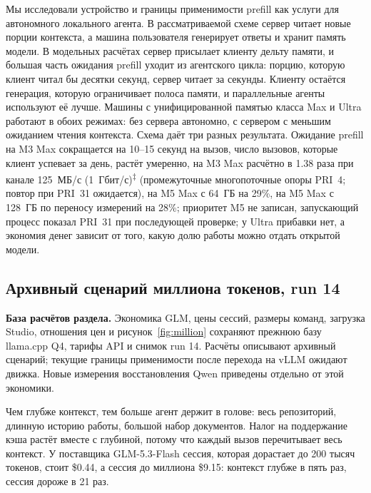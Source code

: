 Мы исследовали устройство и границы применимости prefill как услуги для автономного локального агента.
В рассматриваемой схеме сервер читает новые порции контекста, а машина
пользователя генерирует ответы и хранит память модели. В модельных расчётах сервер присылает клиенту дельту памяти, и большая часть ожидания
prefill уходит из агентского цикла: порцию, которую клиент читал бы десятки секунд, сервер читает за секунды. Клиенту остаётся
генерация, которую ограничивает полоса памяти, и параллельные агенты используют её лучше. Машины с
унифицированной памятью класса Max и Ultra работают в обоих режимах: без сервера автономно, с сервером с меньшим
ожиданием чтения контекста. Схема даёт три разных
результата. Ожидание prefill на M3 Max сокращается на 10--15 секунд на вызов, число вызовов, которые клиент успевает
за день, растёт умеренно, на M3 Max расчётно в 1.38 раза при канале 125~МБ/с (1~Гбит/с)\textsuperscript{‡} (промежуточные многопоточные опоры PRI~4; повтор при PRI~31 ожидается), на M5 Max с 64~ГБ на 29\%, на M5 Max с 128~ГБ по переносу измерений на 28\%; приоритет M5 не записан, запускающий процесс показал PRI~31 при последующей проверке; у Ultra прибавки нет, а экономия денег зависит от того, какую долю работы
можно отдать открытой модели.

\subsection{Архивный сценарий миллиона токенов, run 14}
\label{app:million-history}

\textbf{База расчётов раздела.} Экономика GLM, цены сессий, размеры команд, загрузка Studio,
отношения цен и рисунок~\ref{fig:million} сохраняют прежнюю базу llama.cpp Q4, тарифы API и снимок run 14.
Расчёты описывают архивный сценарий; текущие границы применимости после перехода на vLLM ожидают движка.
Новые измерения восстановления Qwen приведены отдельно от этой экономики.

Чем глубже контекст, тем больше агент держит в голове: весь репозиторий, длинную историю работы, большой набор
документов. Налог на поддержание кэша растёт вместе с глубиной, потому что каждый вызов перечитывает весь контекст. У
поставщика GLM-5.3-Flash сессия, которая дорастает до 200 тысяч токенов, стоит \$0.44, а сессия до миллиона \$9.15:
контекст глубже в пять раз, сессия дороже в 21 раз.

